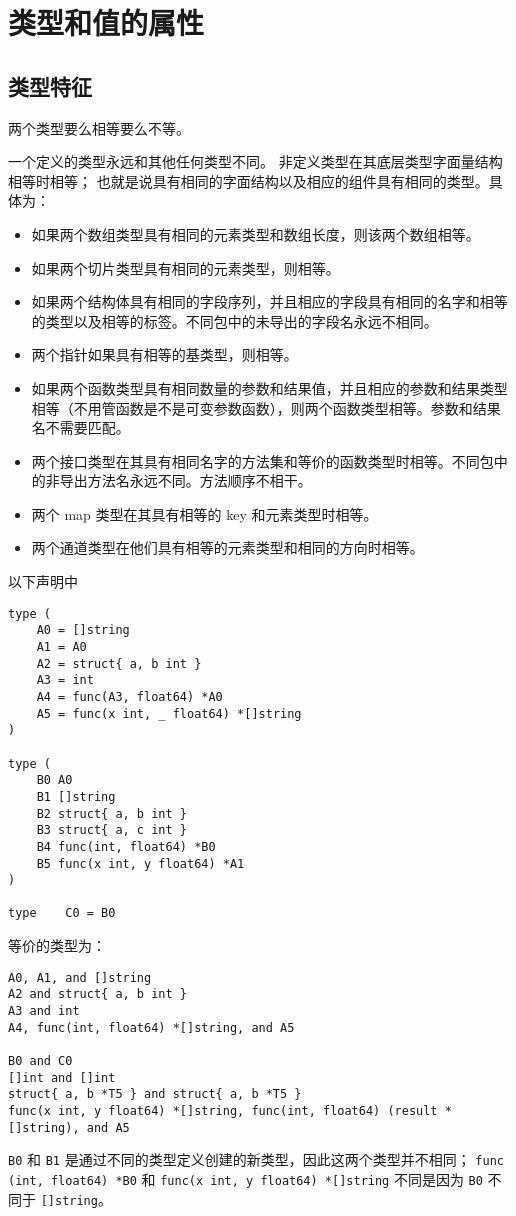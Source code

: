 \chapter{类型和值的属性}

\section{类型特征}
两个类型要么相等要么不等。

一个定义的类型永远和其他任何类型不同。
非定义类型在其底层类型字面量结构相等时相等；
也就是说具有相同的字面结构以及相应的组件具有相同的类型。具体为：
\begin{itemize}
\item 如果两个数组类型具有相同的元素类型和数组长度，则该两个数组相等。
\item 如果两个切片类型具有相同的元素类型，则相等。
\item 如果两个结构体具有相同的字段序列，并且相应的字段具有相同的名字和相等的类型以及相等的标签。不同包中的未导出的字段名永远不相同。
\item 两个指针如果具有相等的基类型，则相等。
\item 如果两个函数类型具有相同数量的参数和结果值，并且相应的参数和结果类型相等（不用管函数是不是可变参数函数），则两个函数类型相等。参数和结果名不需要匹配。
\item 两个接口类型在其具有相同名字的方法集和等价的函数类型时相等。不同包中的非导出方法名永远不同。方法顺序不相干。
\item 两个 map 类型在其具有相等的 key 和元素类型时相等。
\item 两个通道类型在他们具有相等的元素类型和相同的方向时相等。
\end{itemize}

以下声明中
\begin{lstlisting}[style=golang]
type (
	A0 = []string
	A1 = A0
	A2 = struct{ a, b int }
	A3 = int
	A4 = func(A3, float64) *A0
	A5 = func(x int, _ float64) *[]string
)

type (
	B0 A0
	B1 []string
	B2 struct{ a, b int }
	B3 struct{ a, c int }
	B4 func(int, float64) *B0
	B5 func(x int, y float64) *A1
)

type	C0 = B0
\end{lstlisting}
等价的类型为：
\begin{lstlisting}[style=golang]
A0, A1, and []string
A2 and struct{ a, b int }
A3 and int
A4, func(int, float64) *[]string, and A5

B0 and C0
[]int and []int
struct{ a, b *T5 } and struct{ a, b *T5 }
func(x int, y float64) *[]string, func(int, float64) (result *[]string), and A5
\end{lstlisting}
\lstinline|B0| 和 \lstinline|B1| 是通过不同的类型定义创建的新类型，因此这两个类型并不相同；
\lstinline[style=golang]|func (int, float64) *B0| 和 \lstinline[style=golang]|func(x int, y float64) *[]string| 不同是因为 \lstinline|B0| 不同于 \lstinline[style=golang]|[]string|。



